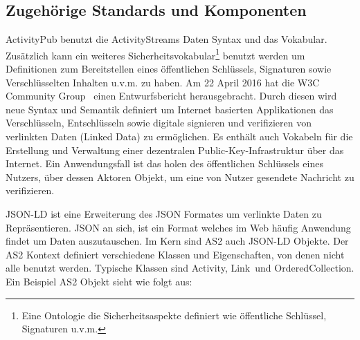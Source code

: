 		
	
	\subsection{Zugehörige Standards und Komponenten}
		ActivityPub benutzt die ActivityStreams Daten Syntax und das Vokabular. Zusätzlich kann ein weiteres Sicherheitsvokabular\footnote{Eine Ontologie die Sicherheitsaspekte definiert wie öffentliche Schlüssel, Signaturen u.v.m.} benutzt werden um Definitionen zum Bereitstellen eines öffentlichen Schlüssels, Signaturen sowie Verschlüsselten Inhalten u.v.m. zu haben. Am 22 April 2016 hat die \glqq W3C Community Group\grqq~ einen Entwurfsbericht herausgebracht. Durch diesen wird neue Syntax und Semantik definiert um Internet basierten Applikationen das Verschlüsseln, Entschlüsseln sowie digitale signieren und verifizieren von verlinkten Daten (Linked Data) zu ermöglichen. Es enthält auch Vokabeln für die Erstellung und Verwaltung einer dezentralen Public-Key-Infrastruktur über das Internet\cite{security-vocab-linked-data}. Ein Anwendungsfall ist das holen des öffentlichen Schlüssels eines Nutzers, über dessen Aktoren Objekt, um eine von Nutzer gesendete Nachricht zu verifizieren.
		
		\gls{JSON-LD} ist eine Erweiterung des JSON Formates um verlinkte Daten zu Repräsentieren. JSON an sich, ist ein Format welches im Web häufig Anwendung findet um Daten auszutauschen. Im Kern sind \gls{AS2} auch \gls{JSON-LD} Objekte. Der \gls{AS2} Kontext definiert verschiedene Klassen und Eigenschaften, von denen nicht alle benutzt werden. Typische Klassen sind \glqq Activity\grqq, \glqq Link\grqq~und \glqq OrderedCollection\grqq. Ein Beispiel \gls{AS2} Objekt sieht wie folgt aus: 	
		
		
